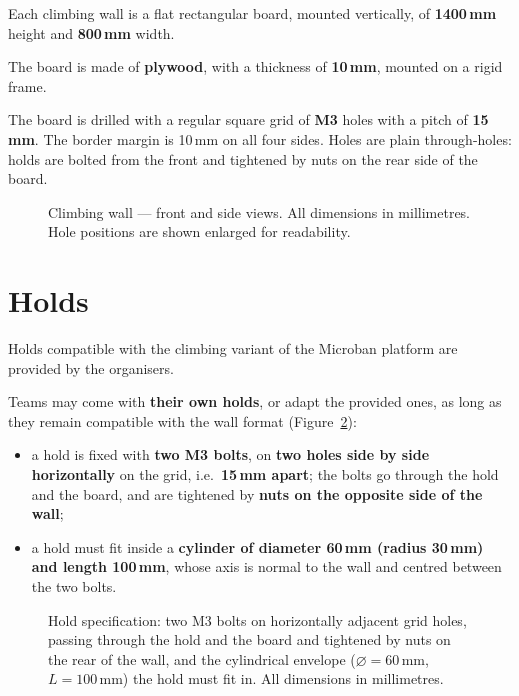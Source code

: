 \documentclass[11pt,a4paper]{article}
\begin{document}
Each climbing wall is a flat rectangular board, mounted vertically, of
\textbf{1400\,mm} height and \textbf{800\,mm} width.

The board is made of \textbf{plywood}, with a thickness of \textbf{10\,mm},
mounted on a rigid frame.

The board is drilled with a regular square grid of \textbf{M3} holes with
a pitch of \textbf{15\,mm}. The border margin is 10\,mm on all four sides.
Holes are plain through-holes: holds are bolted from the front and
tightened by nuts on the rear side of the board.

\begin{figure}[h!]
  \centering
  
  \caption{Climbing wall --- front and side views. All dimensions in
           millimetres. Hole positions are shown enlarged for readability.}
  \label{fig:wall}
\end{figure}

\section{Holds}
\label{sec:holds}

Holds compatible with the climbing variant of the Microban platform are
provided by the organisers.

Teams may come with \textbf{their own holds}, or adapt the provided ones, as
long as they remain compatible with the wall format (Figure~\ref{fig:hold}):
\begin{itemize}
  \item a hold is fixed with \textbf{two M3 bolts}, on \textbf{two holes side
        by side horizontally} on the grid, i.e.\ \textbf{15\,mm apart}; the bolts go through the hold
        and the board, and are tightened by \textbf{nuts on the opposite side
        of the wall};
  \item a hold must fit inside a \textbf{cylinder of diameter 60\,mm (radius 30\,mm) and length
        100\,mm}, whose axis is normal to the wall and centred between the two
        bolts.
\end{itemize}

\begin{figure}[h!]
  \centering
  
  \caption{Hold specification: two M3 bolts on horizontally adjacent grid holes, passing
           through the hold and the board and tightened by nuts on the rear of
           the wall, and the cylindrical envelope ($\varnothing=60$\,mm, $L=100$\,mm) the
           hold must fit in. All dimensions in millimetres.}
  \label{fig:hold}
\end{figure}
\end{document}

